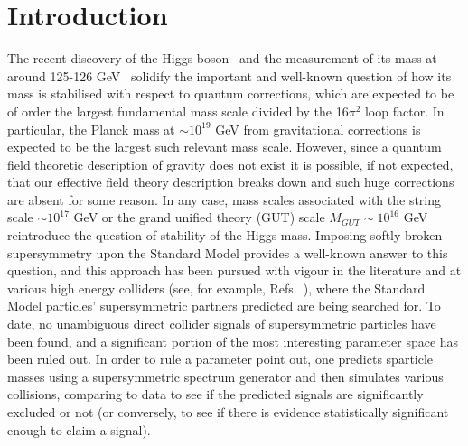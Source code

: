 \documentclass[final,3p,times,pdflatex]{elsarticle}
\begin{document}
\section{Introduction}

The recent discovery of the Higgs boson~\cite{Aad:2012tfa,Chatrchyan:2012ufa}
and the measurement of its mass at around 
125-126 GeV~\cite{ATLAS-CONF-2013-014} solidify the important and well-known
question of how its mass is 
stabilised with respect to quantum corrections, which are expected to be of
order the largest fundamental mass scale divided by the 16$\pi^2$ loop factor.
In particular, the Planck mass at $\sim 10^{19}$ GeV from gravitational
corrections is expected to be the largest such relevant mass scale. 
However, since a quantum field theoretic description of gravity does not
exist it is possible, if not expected, that our effective field theory
description breaks down and such huge corrections are absent
for some reason. 
In any case, mass scales associated with the string scale $\sim 10^{17}$ GeV
or the grand unified theory (GUT) scale $M_{GUT}\sim 10^{16}$ GeV reintroduce
the question of stability of 
the Higgs mass.  
Imposing softly-broken supersymmetry upon the Standard Model provides a
well-known answer to this question, and this approach has been pursued
with vigour in the literature and at various high energy colliders (see, for
example, Refs.~\cite{Aad:2013wta,Chatrchyan:2014lfa}), where 
the Standard Model particles' supersymmetric partners predicted are being
searched for. To date, no unambiguous direct collider signals of
supersymmetric particles have been found, and a significant portion of the
most interesting parameter space has been ruled out. 
In order to rule a parameter point out, one predicts sparticle masses using
a supersymmetric spectrum generator and then simulates various collisions,
comparing to data to see if the predicted signals are significantly excluded
or not (or conversely, to see if there is evidence statistically significant
enough to claim a signal).
\end{document}
